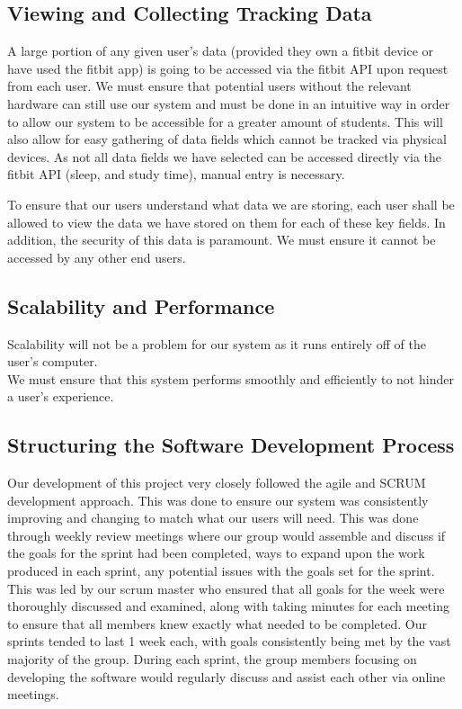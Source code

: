 \documentclass[12pt]{article}
\begin{document}
\subsection{Viewing and Collecting Tracking Data}
A large portion of any given user's data (provided they own a fitbit device or have used the fitbit app) is going to be accessed via the fitbit API upon request from each user. We must ensure that potential users without the relevant hardware can still use our system and must be done in an intuitive way in order to allow our system to be accessible for a greater amount of students. This will also allow for easy gathering of data fields which cannot be tracked via physical devices. As not all data fields we have selected can be accessed directly via the fitbit API (sleep, and study time), manual entry is necessary.\newline

To ensure that our users understand what data we are storing, each user shall be allowed to view the data we have stored on them for each of these key fields.
In addition, the security of this data is paramount. We must ensure it cannot be accessed by any other end users.


\subsection{Scalability and Performance}

Scalability will not be a problem for our system as it runs entirely off of the user's computer.\\

We must ensure that this system performs smoothly and efficiently to not hinder a user's experience.


\subsection{Structuring the Software Development Process}

Our development of this project very closely followed the agile and SCRUM development approach. This was done to ensure our system was consistently improving and changing to match what our users will need. This was done through weekly review meetings where our group would assemble and discuss if the goals for the sprint had been completed, ways to expand upon the work produced in each sprint, any potential issues with the goals set for the sprint. This was led by our scrum master who ensured that all goals for the week were thoroughly discussed and examined, along with taking minutes for each meeting to ensure that all members knew exactly what needed to be completed. Our sprints tended to last 1 week each, with goals consistently being met by the vast majority of the group. During each sprint, the group members focusing on developing the software would regularly discuss and assist each other via online meetings.\\
\end{document}
